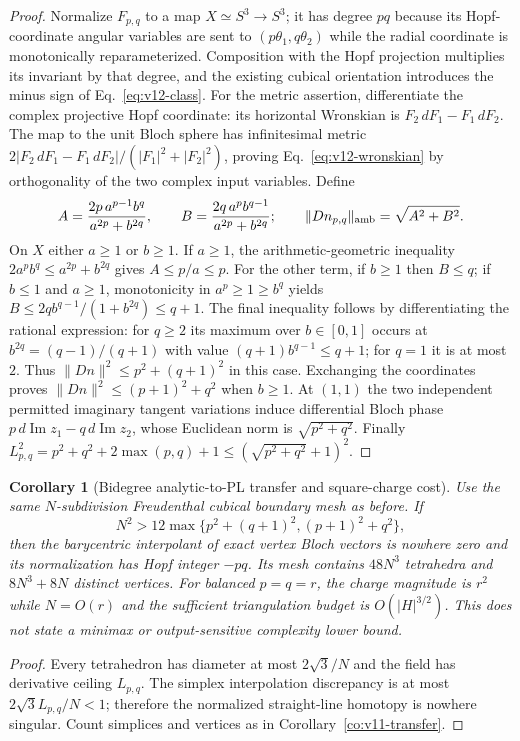 \documentclass[aps,prd,onecolumn,notitlepage,11pt,superscriptaddress,longbibliography]{revtex4-2}
\newtheorem{corollary}{Corollary}
\begin{document}
\begin{proof}
Normalize $F_{p,q}$ to a map $X\simeq S^3\to S^3$; it has degree $pq$ because its Hopf-coordinate angular variables are sent to $(p\theta_1,q\theta_2)$ while the radial coordinate is monotonically reparameterized. Composition with the Hopf projection multiplies its invariant by that degree, and the existing cubical orientation introduces the minus sign of Eq.~\eqref{eq:v12-class}. For the metric assertion, differentiate the complex projective Hopf coordinate: its horizontal Wronskian is $F_2\,dF_1-F_1\,dF_2$. The map to the unit Bloch sphere has infinitesimal metric $2|F_2\,dF_1-F_1\,dF_2|/(|F_1|^2+|F_2|^2)$, proving Eq.~\eqref{eq:v12-wronskian} by orthogonality of the two complex input variables. Define
\begin{equation}
 A=\frac{2p\,a^{p-1}b^q}{a^{2p}+b^{2q}},\qquad
 B=\frac{2q\,a^p b^{q-1}}{a^{2p}+b^{2q}};
 \qquad\|Dn_{p,q}\|_{\rm amb}=\sqrt{A^2+B^2}.
\end{equation}
On $X$ either $a\ge1$ or $b\ge1$. If $a\ge1$, the arithmetic-geometric inequality $2a^pb^q\le a^{2p}+b^{2q}$ gives $A\le p/a\le p$. For the other term, if $b\ge1$ then $B\le q$; if $b\le1$ and $a\ge1$, monotonicity in $a^p\ge1\ge b^q$ yields
$B\le2q b^{q-1}/(1+b^{2q})\le q+1$.
The final inequality follows by differentiating the rational expression: for $q\ge2$ its maximum over $b\in[0,1]$ occurs at $b^{2q}=(q-1)/(q+1)$ with value $(q+1)b^{q-1}\le q+1$; for $q=1$ it is at most $2$. Thus $\|Dn\|^2\le p^2+(q+1)^2$ in this case. Exchanging the coordinates proves $\|Dn\|^2\le(p+1)^2+q^2$ when $b\ge1$. At $(1,1)$ the two independent permitted imaginary tangent variations induce differential Bloch phase $p\,d\operatorname{Im}z_1-q\,d\operatorname{Im}z_2$, whose Euclidean norm is $\sqrt{p^2+q^2}$. Finally $L_{p,q}^2=p^2+q^2+2\max(p,q)+1\le(\sqrt{p^2+q^2}+1)^2$.
\end{proof}

\begin{corollary}[Bidegree analytic-to-PL transfer and square-charge cost]\label{co:v12-grid}
Use the same $N$-subdivision Freudenthal cubical boundary mesh as before. If
\begin{equation}\label{eq:v12-N}
\boxed{\quad N^2>12\max\{p^2+(q+1)^2,(p+1)^2+q^2\},\quad}
\end{equation}
then the barycentric interpolant of exact vertex Bloch vectors is nowhere zero and its normalization has Hopf integer $-pq$. Its mesh contains $48N^3$ tetrahedra and $8N^3+8N$ distinct vertices. For balanced $p=q=r$, the charge magnitude is $r^2$ while $N=O(r)$ and the sufficient triangulation budget is $O(|H|^{3/2})$. This does not state a minimax or output-sensitive complexity lower bound.
\end{corollary}
\begin{proof}
Every tetrahedron has diameter at most $2\sqrt3/N$ and the field has derivative ceiling $L_{p,q}$. The simplex interpolation discrepancy is at most $2\sqrt3L_{p,q}/N<1$; therefore the normalized straight-line homotopy is nowhere singular. Count simplices and vertices as in Corollary~\ref{co:v11-transfer}.
\end{proof}
\end{document}
